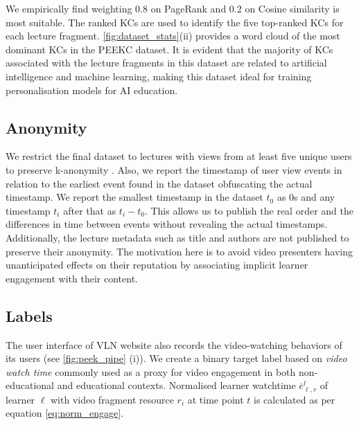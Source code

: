 \documentclass[letterpaper]{article} %
\begin{document}
We empirically find weighting 0.8 on PageRank and 0.2 on Cosine similarity is most suitable. The ranked KCs are used to identify the five top-ranked KCs for each lecture fragment. 
\figurename{ \ref{fig:dataset_stats}(ii)} provides a word cloud of the most dominant KCs in the PEEKC dataset. It is evident that the majority of KCs associated with the lecture fragments in this dataset are related to artificial intelligence and machine learning, making this dataset ideal for training personalisation models for AI education.

\subsection{Anonymity}

We restrict the final dataset to lectures with views from at least five unique users to preserve k-anonymity \cite{orcas_dataset}. Also, we report the timestamp of user view events in relation to the earliest event found in the dataset obfuscating the actual timestamp. We report the smallest timestamp in the dataset $t_0$ as 0s and any timestamp $t_i$ after that as $t_i - t_0$. This allows us to publish the real order and the differences in time between events without revealing the actual timestamps. Additionally, the lecture metadata such as title and authors are not published to preserve their anonymity. The motivation here is to avoid video presenters having unanticipated effects on their reputation by associating implicit learner engagement with their content.


\subsection{Labels}
The user interface of VLN website also records the video-watching behaviors of its users (see \figurename{ \ref{fig:peek_pipe} (i)}). 
We create a binary target label based on 
\emph{video watch time} commonly used as a proxy for video engagement in both non-educational \cite{Covington2016,beyondviews} and educational \cite{Guo_vid_prod,truelearn} contexts. Normalised learner watchtime $\overline{e}^t_{\ell,r}$ of learner $\ell$ with video fragment resource $r_i$ at time point $t$ is calculated as per equation \ref{eq:norm_engage}.
\end{document}
